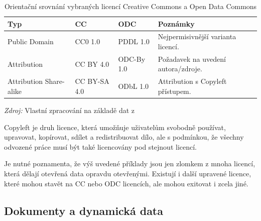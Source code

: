 \begin{table}[!tbp]

\begin{center}
\setlength{\tabcolsep}{3pt}
\renewcommand{\arraystretch}{1.05}
\scriptsize
\caption{Orientační srovnání vybraných licencí Creative Commons a Open Data Commons}\label{tab:prehled-licenci}
\begin{threeparttable}
\begin{tabularx}{\textwidth}{@{}
>{\raggedright\arraybackslash}p{}
  >{\raggedright\arraybackslash}p{}
  >{\raggedright\arraybackslash}p{}
  X@{}}
\toprule
\textbf{Typ} & \textbf{CC} & \textbf{ODC} & \textbf{Poznámky} \\
\midrule
Public Domain & CC0 1.0 & PDDL 1.0 & Nejpermisivnější varianta licencí. \\
Attribution & CC BY 4.0 & ODC-By 1.0 & Požadavek na uvedení autora/zdroje. \\
Attribution Share-alike & CC BY-SA 4.0 & ODbL 1.0 & Attribution s Copyleft\hypertarget{tm:licence-a}{\hyperlink{tn:licence-a}{\tnote{a}}} přístupem.  \\
\bottomrule
\end{tabularx}

\footnotesize \textit{Zdroj:} Vlastní zpracování na základě dat z \parencite{ReusersGuideOpen2013,CCLicenses}

\begin{tablenotes}[flushleft]
  \footnotesize
  \item[a] \hypertarget{tn:licence-a}{} Copyleft je druh licence, která umožňuje uživatelům svobodně používat, upravovat, kopírovat, sdílet a redistribuovat dílo, ale s podmínkou, že všechny odvozené práce musí být také licencovány pod stejnout licencí. \parencite{Copyleft2026}
\end{tablenotes}
\end{threeparttable}
\end{center}

\end{table}
Je nutné poznamenta, že výš uvedené příklady jsou jen zlomkem z mnoha licencí, která dělají otevřená data opravdu otevřenými. Existují i další upravené licence, které mohou stavět na CC nebo ODC licencích, ale mohou exitovat i zcela jiné.

\subsection{Dokumenty a dynamická data}


